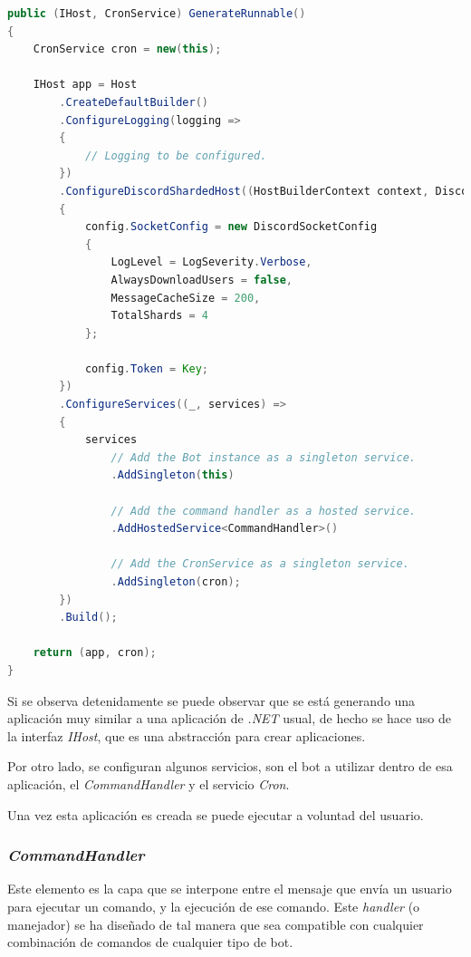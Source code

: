 \begin{lstlisting}[language=java]
public (IHost, CronService) GenerateRunnable()
{
    CronService cron = new(this);

    IHost app = Host
        .CreateDefaultBuilder()
        .ConfigureLogging(logging =>
        {
            // Logging to be configured.
        })
        .ConfigureDiscordShardedHost((HostBuilderContext context, DiscordHostConfiguration config) =>
        {
            config.SocketConfig = new DiscordSocketConfig
            {
                LogLevel = LogSeverity.Verbose,
                AlwaysDownloadUsers = false,
                MessageCacheSize = 200,
                TotalShards = 4
            };

            config.Token = Key;
        })
        .ConfigureServices((_, services) =>
        {
            services
                // Add the Bot instance as a singleton service.
                .AddSingleton(this)

                // Add the command handler as a hosted service.
                .AddHostedService<CommandHandler>()

                // Add the CronService as a singleton service.
                .AddSingleton(cron);
        })
        .Build();

    return (app, cron);
}
\end{lstlisting}

Si se observa detenidamente se puede observar que se está generando una aplicación muy similar a una aplicación de \textit{.NET} usual, de hecho se hace uso de la interfaz \textit{IHost}, que es una abstracción para crear aplicaciones.

Por otro lado, se configuran algunos servicios, son el bot a utilizar dentro de esa aplicación, el \textit{CommandHandler} y el servicio \textit{Cron}.

Una vez esta aplicación es creada se puede ejecutar a voluntad del usuario.

\subsubsection{\textit{CommandHandler}}

Este elemento es la capa que se interpone entre el mensaje que envía un usuario para ejecutar un comando, y la ejecución de ese comando. Este \textit{handler} (o manejador) se ha diseñado de tal manera que sea compatible con cualquier combinación de comandos de cualquier tipo de bot.

